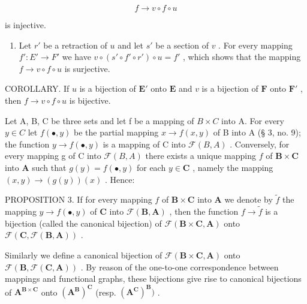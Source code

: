 \[
f \rightarrow v \circ f \circ u
\]

is injective.

\begin{enumerate}
\def\labelenumi{(\arabic{enumi})}
\setcounter{enumi}{1}
\tightlist
\item
  Let \(r'\) be a retraction of \(u\) and let \(s'\) be a section of \(v\) . For every mapping \(f': E' \to F'\) we have \(v \circ (s' \circ f' \circ r') \circ u = f'\) , which shows that the mapping \(f \to v \circ f \circ u\) is surjective.
\end{enumerate}

COROLLARY. If \(u\) is a bijection of \(\mathbf{E}'\) onto \(\mathbf{E}\) and \(v\) is a bijection of \(\mathbf{F}\) onto \(\mathbf{F}'\) , then \(f \to v \circ f \circ u\) is bijective.

Let A, B, C be three sets and let f be a mapping of \(B \times C\) into A. For every \(y \in C\) let \(f(\bullet, y)\) be the partial mapping \(x \to f(x, y)\) of B into A (§ 3, no. 9); the function \(y \to f(\bullet, y)\) is a mapping of C into \(\mathcal{F}(B, A)\) . Conversely, for every mapping g of C into \(\mathcal{F}(B, A)\) there exists a unique mapping \(f\) of \(\mathbf{B} \times \mathbf{C}\) into \(\mathbf{A}\) such that \(g(y) = f(\bullet, y)\) for each \(y \in \mathbf{C}\) , namely the mapping \((x, y) \to (g(y))(x)\) . Hence:

PROPOSITION 3. If for every mapping \(f\) of \(\mathbf{B} \times \mathbf{C}\) into \(\mathbf{A}\) we denote by \(\tilde{f}\) the mapping \(y \to f(\bullet, y)\) of \(\mathbf{C}\) into \(\mathcal{F}(\mathbf{B}, \mathbf{A})\) , then the function \(f \to \tilde{f}\) is a bijection (called the canonical bijection) of \(\mathcal{F}(\mathbf{B} \times \mathbf{C}, \mathbf{A})\) onto \(\mathcal{F}(\mathbf{C}, \mathcal{F}(\mathbf{B}, \mathbf{A}))\) .

Similarly we define a canonical bijection of \(\mathcal{F}(\mathbf{B}\times\mathbf{C},\mathbf{A})\) onto \(\mathcal{F}(\mathbf{B},\mathcal{F}(\mathbf{C},\mathbf{A}))\) . By reason of the one-to-one correspondence between mappings and functional graphs, these bijections give rise to canonical bijections of \(\mathbf{A}^{\mathbf{B}\times\mathbf{C}}\) onto \((\mathbf{A}^{\mathbf{B}})^{\mathbf{C}}\) (resp. \((\mathbf{A}^{\mathbf{C}})^{\mathbf{B}})\) .

